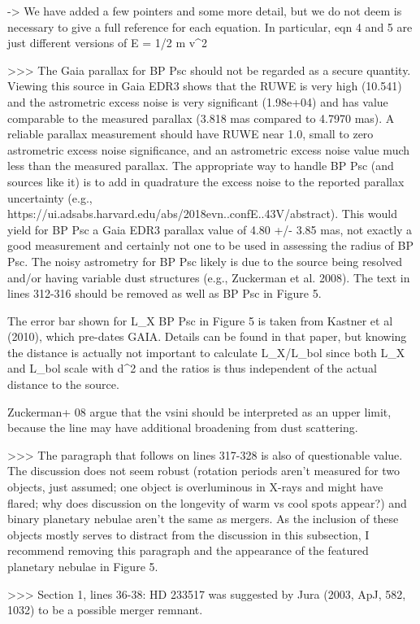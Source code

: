 -> We have added a few pointers and some more detail, but we do not deem is necessary to give a full reference for each equation. In particular, eqn 4 and 5 are just different versions of E = 1/2 m v^2

>>> The Gaia parallax for BP Psc should not be regarded as a secure quantity. Viewing this source in Gaia EDR3 shows that the RUWE is very high (10.541) and the astrometric excess noise is very significant (1.98e+04) and has value comparable to the measured parallax (3.818 mas compared to 4.7970 mas). A reliable parallax measurement should have RUWE near 1.0, small to zero astrometric excess noise significance, and an astrometric excess noise value much less than the measured parallax. The appropriate way to handle BP Psc (and sources like it) is to add in quadrature the excess noise to the reported parallax uncertainty (e.g., https://ui.adsabs.harvard.edu/abs/2018evn..confE..43V/abstract). This would yield for BP Psc a Gaia EDR3 parallax value of 4.80 +/- 3.85 mas, not exactly a good measurement and certainly not one to be used in assessing the radius of BP Psc. The noisy astrometry for BP Psc likely is due to the source being resolved and/or having variable dust structures (e.g., Zuckerman et al. 2008). The text in lines 312-316 should be removed as well as BP Psc in Figure 5.

The error bar shown for L_X BP Psc in Figure 5 is taken from Kastner et al (2010), which pre-dates GAIA. Details can be found in that paper, but knowing the distance is actually not important to calculate L_X/L_bol since both L_X and L_bol scale with d^2 and the ratios is thus independent of the actual distance to the source. 

Zuckerman+ 08 argue that the vsini should be interpreted as an upper limit, because the line may have additional broadening from dust scattering.

>>> The paragraph that follows on lines 317-328 is also of questionable value. The discussion does not seem robust (rotation periods aren't measured for two objects, just assumed; one object is overluminous in X-rays and might have flared; why does discussion on the longevity of warm vs cool spots appear?) and binary planetary nebulae aren't the same as mergers. As the inclusion of these objects mostly serves to distract from the discussion in this subsection, I recommend removing this paragraph and the appearance of the featured planetary nebulae in Figure 5.


>>> Section 1, lines 36-38: HD 233517 was suggested by Jura (2003, ApJ, 582, 1032) to be a possible merger remnant.


